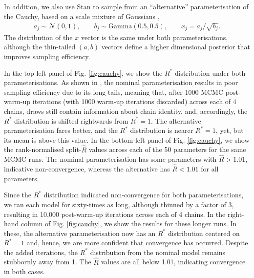\documentclass{article}
\newcommand{\N}{\mathcal{N}}
\begin{document}
In addition, we also use Stan to sample from an ``alternative'' parameterisation of the Cauchy, based on a scale mixture of Gaussians \citep{vehtari2019rank},
%
\begin{align}
a_j \sim  \N(0,1), \qquad
b_j \sim  \text{Gamma}(0.5, 0.5), \qquad
x_j =  a_j/\sqrt{b_j}.
\end{align}
%
The distribution of the $x$ vector is the same under both parameterisations, although the thin-tailed $(a,b)$ vectors define a higher dimensional posterior that improves sampling efficiency.

In the top-left panel of Fig. \ref{fig:cauchy}, we show the $R^*$ distribution under both parameterisations. As shown in \cite{vehtari2019rank}, the nominal parameterisation results in poor sampling efficiency due to its long tails, meaning that, after 1000 MCMC post-warm-up iterations (with 1000 warm-up iterations discarded) across each of 4 chains, draws still contain information about chain identity, and, accordingly, the $R^*$ distribution is shifted rightwards from $R^*=1$. The alternative parameterisation fares better, and the $R^*$ distribution is nearer $R^*=1$, yet, but its mean is above this value. In the bottom-left panel of Fig. \ref{fig:cauchy}, we show the rank-normalised split-$\widehat{R}$ values across each of the 50 parameters for the same MCMC runs. The nominal parameterisation has some parameters with $\widehat{R}>1.01$, indicative non-convergence, whereas the alternative has $\widehat{R}<1.01$ for all parameters.

Since the $R^*$ distribution indicated non-convergence for both parameterisations, we ran each model for sixty-times as long, although thinned by a factor of 3, resulting in 10,000 post-warm-up iterations across each of 4 chains. In the right-hand column of Fig. \ref{fig:cauchy}, we show the results for these longer runs. In these, the alternative parameterisation now has an $R^*$ distribution centered on $R^*=1$ and, hence, we are more confident that convergence has occurred. Despite the added iterations, the $R^*$ distribution from the nominal model remains stubbornly away from 1. The $\widehat{R}$ values are all below 1.01, indicating convergence in both cases.
\end{document}
